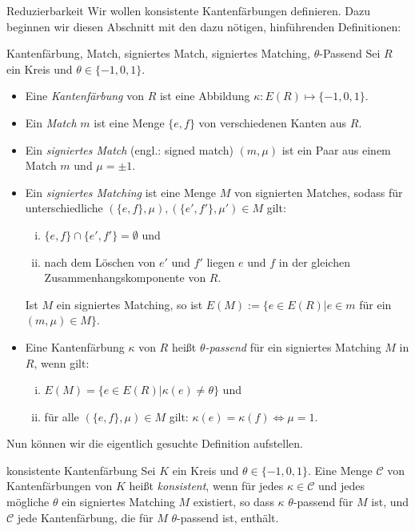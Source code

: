 \begin{section}{Reduzierbarkeit}
 Wir wollen konsistente Kantenfärbungen definieren. Dazu beginnen wir diesen Abschnitt mit den dazu nötigen, hinführenden Definitionen:

 \begin{definition}{Kantenfärbung, Match, signiertes Match, signiertes Matching, $\theta$-Passend}
  Sei $R$ ein Kreis und $\theta \in \{-1,0,1\}$.
  \begin{itemize}
   \item Eine \textit{Kantenfärbung} von $R$ ist eine Abbildung $\kappa: E(R) \mapsto \{-1,0,1\}$.
   \item Ein \textit{Match} $m$ ist eine Menge $\{e,f\}$ von verschiedenen Kanten aus $R$. 
   \item Ein \textit{signiertes Match} (engl.: signed match) $(m,\mu)$ ist ein Paar aus einem Match $m$ und $\mu = \pm 1$.
   \item Ein \textit{signiertes Matching} ist eine Menge $M$ von signierten Matches, sodass für unterschiedliche $(\{e,f\},\mu),(\{e',f'\},\mu') \in M$ gilt:
   \begin{enumerate}[(i)]
    \item $\{e,f\}\cap\{e',f'\} = \emptyset$ und
    \item nach dem Löschen von $e'$ und $f'$ liegen $e$ und $f$ in der gleichen Zusammenhangskomponente von $R$.
   \end{enumerate}
   Ist $M$ ein signiertes Matching, so ist $E(M) := \{e\in E(R) | e\in m $ für ein $(m,\mu) \in M\}$.
   \item Eine Kantenfärbung $\kappa$ von $R$ heißt \textit{$\theta$-passend} für ein signiertes Matching $M$ in $R$, wenn gilt:
   \begin{enumerate}[(i)]
    \item $E(M) = \{e \in E(R) | \kappa(e) \neq \theta\}$ und
    \item für alle $(\{e,f\},\mu) \in M$ gilt: $\kappa(e) = \kappa(f) \Leftrightarrow \mu = 1$.
   \end{enumerate}
  \end{itemize}
 \end{definition}
 
 Nun können wir die eigentlich gesuchte Definition aufstellen.
  
 \begin{definition}{konsistente Kantenfärbung}
  Sei $K$ ein Kreis und $\theta \in \{-1,0,1\}$. Eine Menge $\mathscr{C}$ von Kantenfärbungen von $K$ heißt \textit{konsistent}, wenn für jedes $\kappa \in \mathscr{C}$ und jedes mögliche $\theta$ ein signiertes Matching $M$ existiert, so dass $\kappa$ $\theta$-passend für $M$ ist, und $\mathscr{C}$ jede Kantenfärbung, die für $M$ $\theta$-passend ist, enthält.
 \end{definition}


\end{section}
